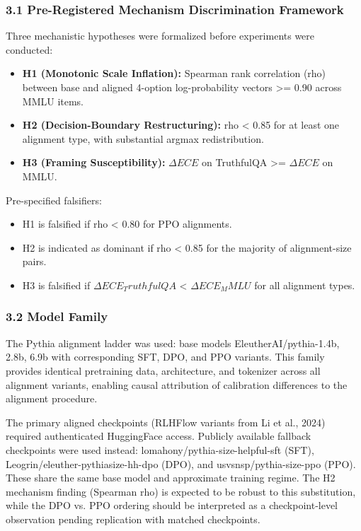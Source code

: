 
\subsubsection{3.1 Pre-Registered Mechanism Discrimination Framework}

Three mechanistic hypotheses were formalized before experiments were conducted:

\begin{itemize}
\item \textbf{H1 (Monotonic Scale Inflation):} Spearman rank correlation (rho) between base and aligned 4-option log-probability vectors >= 0.90 across MMLU items.
\item \textbf{H2 (Decision-Boundary Restructuring):} rho < 0.85 for at least one alignment type, with substantial argmax redistribution.
\item \textbf{H3 (Framing Susceptibility):} $\Delta ECE$ on TruthfulQA >= $\Delta ECE$ on MMLU.
\end{itemize}

Pre-specified falsifiers:
\begin{itemize}
\item H1 is falsified if rho < 0.80 for PPO alignments.
\item H2 is indicated as dominant if rho < 0.85 for the majority of alignment-size pairs.
\item H3 is falsified if $\Delta ECE_TruthfulQA$ < $\Delta ECE_MMLU$ for all alignment types.
\end{itemize}

\subsubsection{3.2 Model Family}

The Pythia alignment ladder was used: base models EleutherAI/pythia-{1.4b, 2.8b, 6.9b} with corresponding SFT, DPO, and PPO variants. This family provides identical pretraining data, architecture, and tokenizer across all alignment variants, enabling causal attribution of calibration differences to the alignment procedure.

The primary aligned checkpoints (RLHFlow variants from Li et al., 2024) required authenticated HuggingFace access. Publicly available fallback checkpoints were used instead: lomahony/pythia-{size}-helpful-sft (SFT), Leogrin/eleuther-pythia{size}-hh-dpo (DPO), and usvsnsp/pythia-{size}-ppo (PPO). These share the same base model and approximate training regime. The H2 mechanism finding (Spearman rho) is expected to be robust to this substitution, while the DPO vs. PPO ordering should be interpreted as a checkpoint-level observation pending replication with matched checkpoints.

